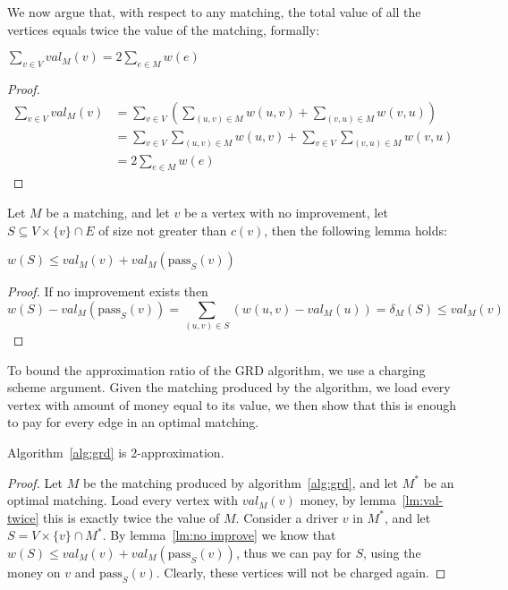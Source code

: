 
We now argue that, with respect to any matching, 
the total value of all the vertices equals twice the value of the matching, 
formally: 
\begin{lemma}
\label{lm:val-twice}
$\sum_{v \in V} val_M(v) = 2 \sum_{e \in M} w(e)$
\end{lemma}

\begin{proof}
\begin{equation}
\begin{split}
\sum_{v \in V} val_M(v)	& = 
\sum_{v \in V} \left( \sum_{(u, v) \in M} w(u, v) + \sum_{(v, u) \in M} w(v, u) \right)	\\
						& = \sum_{v \in V}\sum_{(u, v) \in M} w(u, v) + 
							\sum_{v \in V}\sum_{(v, u) \in M} w(v, u)					\\
						& = 2 \sum_{e \in M} w(e)
\end{split}
\end{equation}
\end{proof}

Let $M$ be a matching, and let $v$ be a vertex with no improvement,
let $S \subseteq V \times \{v\} \cap E$ of size not greater than $c(v)$,
then the following lemma holds:

\begin{lemma}
\label{lm:no improve}
$w(S) \leq val_M(v) + val_M(\text{pass}_S(v))$
\end{lemma}

\begin{proof}
If no improvement exists then
$$
w(S) - val_M(\text{pass}_S(v))=
\sum_{(u,v) \in S}(w(u,v) - val_M(u)) =
\delta_M(S) 
\leq val_M(v)
$$
\end{proof}

To bound the approximation ratio of the GRD algorithm, 
we use a charging scheme argument.
Given the matching produced by the algorithm, 
we load every vertex with amount of money equal to its value,
we then show that this is enough to pay for every edge in an optimal matching.   

\begin{theorem}
Algorithm~\ref{alg:grd} is 2-approximation.
\end{theorem}

\begin{proof}
Let $M$ be the matching produced by algorithm~\ref{alg:grd}, 
and let $M^*$ be an optimal matching.
Load every vertex with $val_M(v)$ money, 
by lemma~\ref{lm:val-twice} this is exactly twice the value of $M$.
Consider a driver $v$ in $M^*$, and let $S = V \times \{v\} \cap M^*$.
By lemma~\ref{lm:no improve} we know that $w(S) \leq val_M(v) + val_M(\text{pass}_S(v))$,
thus we can pay for $S$, using the money on $v$ and $\text{pass}_S(v)$.
Clearly, these vertices will not be charged again.
\end{proof}

